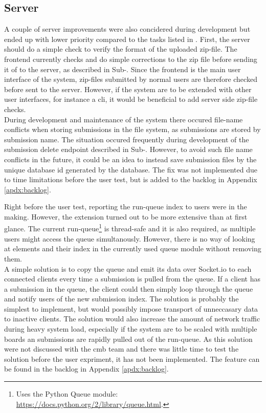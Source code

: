 \subsection{Server}
A couple of server improvements were also concidered during development but ended up with lower priority compared to the tasks listed in . First, the server should do a simple check to verify the format of the uploaded zip-file. The frontend currently checks and do simple corrections to the zip file before sending it of to the server, as described in Sub-. Since the frontend is the main user interface of the system, zip-files submitted by normal users are therefore checked before sent to the server. However, if the system are to be extended with other user interfaces, for instance a \gls{cli}, it would be beneficial to add server side zip-file checks. \\

During development and maintenance of the system there occured file-name conflicts when storing submissions in the file system, as submissions are stored by submission name. The situation occured frequently during development of the submission delete endpoint described in Sub-. However, to avoid such file name conflicts in the future, it could be an idea to instead save submission files by the unique database id generated by the database. The fix was not implemented due to time limitations before the user test, but is added to the backlog in Appendix \ref{apdx:backlog}.

Right before the user test, reporting the run-queue index to users were in the making. However, the extension turned out to be more extensive than at first glance. The current run-queue\footnote{Uses the Python Queue module: \url{https://docs.python.org/2/library/queue.html}.} is thread-safe and it is also required, as multiple users might access the queue simultanously. However, there is no way of looking at elements and their index in the currently used queue module without removing them.  \\

A simple solution is to copy the queue and emit its data over Socket.io to each connected clients every time a submission is pulled from the queue. If a client has a submission in the queue, the client could then simply loop through the queue and notify users of the new submission index. The solution is probably the simplest to implement, but would possibly impose transport of unneccasary data to inactive clients. The solution would also increase the amount of network traffic during heavy system load, especially if the system are to be scaled with multiple boards an submissions are rapidly pulled out of the run-queue. As this solution were not discussed with the \gls{cmb} team and there was little time to test the solution before the user expriment, it has not been implemented. The feature can be found in the backlog in Appendix \ref{apdx:backlog}. \\

